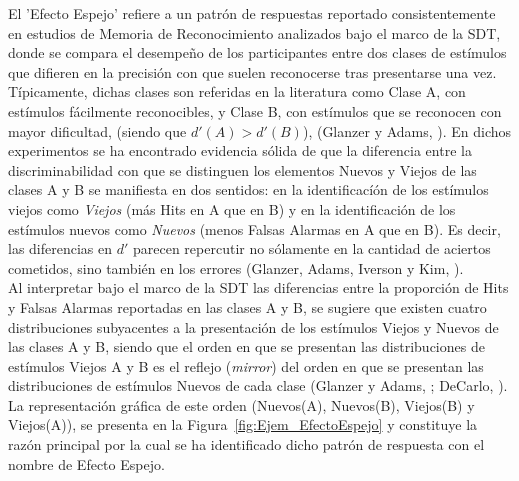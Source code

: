El 'Efecto Espejo' refiere a un patrón de respuestas reportado consistentemente en estudios de Memoria de Reconocimiento analizados bajo el marco de la SDT, donde se compara el desempeño de los participantes entre dos clases de estímulos que difieren en la precisión con que suelen reconocerse tras presentarse una vez. Típicamente, dichas clases son referidas en la literatura como Clase A, con estímulos fácilmente reconocibles, y Clase B, con estímulos que se reconocen con mayor dificultad, (siendo que $d'(A) > d'(B)$), (Glanzer y Adams, \citeyear{Glanzer1990}). En dichos experimentos se ha encontrado evidencia sólida de que la diferencia entre la discriminabilidad con que se distinguen los elementos Nuevos y Viejos de las clases A y B se manifiesta en dos sentidos: en la identificacíón de los estímulos viejos como \textit{Viejos} (más Hits en A que en B) y en la identificación de los estímulos nuevos como \textit{Nuevos} (menos Falsas Alarmas en A que en B). Es decir, las diferencias en $d'$ parecen repercutir no sólamente en la cantidad de aciertos cometidos, sino también en los errores (Glanzer, Adams, Iverson y Kim, \citeyear{Glanzer1993}).\\

Al interpretar bajo el marco de la SDT las diferencias entre la proporción de Hits y Falsas Alarmas reportadas en las clases A y B, se sugiere que existen cuatro distribuciones subyacentes a la presentación de los estímulos Viejos y Nuevos de las clases A y B, siendo que el orden en que se presentan las distribuciones de estímulos Viejos A y B es el reflejo (\textit{mirror}) del orden en que se presentan las distribuciones de estímulos Nuevos de cada clase (Glanzer y Adams, \citeyear{Glanzer1990}; DeCarlo, \citeyear{DeCarlo2007}). La representación gráfica de este orden (Nuevos(A), Nuevos(B), Viejos(B) y Viejos(A)), se presenta en la Figura~\ref{fig:Ejem_EfectoEspejo} y constituye la razón principal por la cual se ha identificado dicho patrón de respuesta con el nombre de Efecto Espejo.\\

